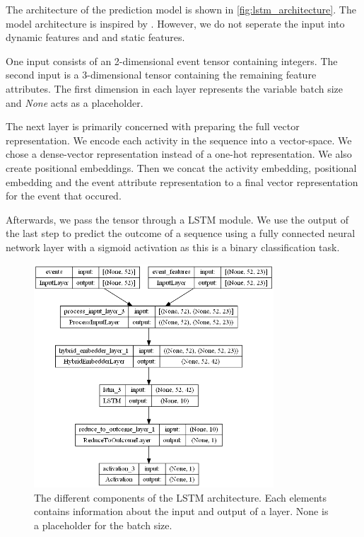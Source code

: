 \documentclass[./../../paper.tex]{subfiles}
\begin{document}
The architecture of the prediction model is shown in \autoref{fig:lstm_architecture}. The model architecture is inspired by \citeauthor{hsieh_DiCE4ELInterpretingProcess_2021}. However, we do not seperate the input into dynamic features and and static features.

One input consists of an 2-dimensional event tensor containing integers. The second input is a 3-dimensional tensor containing the remaining feature attributes. The first dimension in each layer represents the variable batch size and \emph{None} acts as a placeholder.

The next layer is primarily concerned with preparing the full vector representation. We encode each activity in the sequence into a vector-space. We chose a dense-vector representation instead of a one-hot representation. We also create positional embeddings. Then we concat the activity embedding, positional embedding and the event attribute representation to a final vector representation for the event that occured.

Afterwards, we pass the tensor through a \gls{LSTM} module. We use the output of the last step to predict the outcome of a sequence using a fully connected neural network layer with a sigmoid activation as this is a binary classification task. 

\begin{figure}[htbp]
    \centering
    \includegraphics[width=0.8\textwidth]{figures/predictor50lstm.png}
    \caption{The different components of the LSTM architecture. Each elements contains information about the input and output of a layer. None is a placeholder for the batch size.}
    \label{fig:lstm_architecture}
\end{figure}
\end{document}

